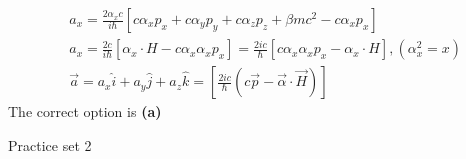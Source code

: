 \begin{enumerate}
\begin{answer}
\begin{align*}
		&a_{x}=\frac{2 \alpha_{x} c}{i \hbar}\left[c \alpha_{x} p_{x}+c \alpha_{y} p_{y}+c \alpha_{z} p_{z}+\beta m c^{2}-c \alpha_{x} p_{x}\right]\\
		&a_{x}=\frac{2 c}{i \hbar}\left[\alpha_{x} \cdot H-c \alpha_{x} \alpha_{x} p_{x}\right]=\frac{2 i c}{\hbar}\left[c \alpha_{x} \alpha_{x} p_{x}-\alpha_{x} \cdot H\right],\left(\alpha_{x}^{2}=x\right) \\
		&\vec{a}=a_{x} \hat{i}+a_{y} \hat{j}+a_{z} \hat{k}=\left[\frac{2 i c}{\hbar}(c \vec{p}-\vec{\alpha} \cdot \vec{H})\right]
	\end{align*}
	The correct option is \textbf{(a)}
\end{answer}
\end{enumerate}
\newpage
\begin{abox}
	Practice set 2
	\end{abox}

